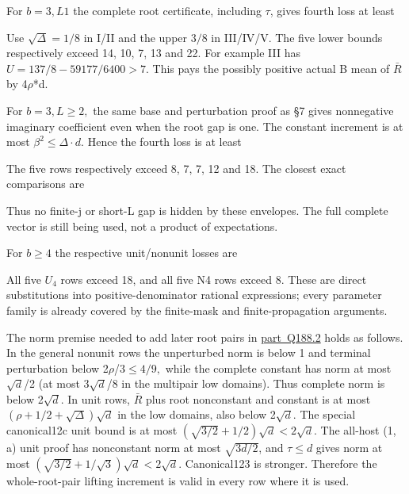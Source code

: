 For \(b=3,\allowbreak \allowbreak  L1\) the complete root certificate, including \(\tau\), gives fourth loss at least



Use \(\sqrt{\Delta}=1/8\) in I/II and the upper \(3/8\) in III/IV/V. The five lower bounds respectively exceed 14, 10, 7, 13 and 22. For example III has \(U=137/8-59177/6400>7\). This pays the possibly positive actual B mean of \(\bar R\) by 4\(\rho\)*d.

For \(b=3,\allowbreak \allowbreak  L\ge 2,\allowbreak \allowbreak  \) the same base and perturbation proof as §7 gives nonnegative imaginary coefficient even when the root gap is one. The constant increment is at most \(\beta^2\le \Delta\cdot d.\) Hence the fourth loss is at least



The five rows respectively exceed 8, 7, 7, 12 and 18. The closest exact comparisons are



Thus no finite-j or short-L gap is hidden by these envelopes. The full complete vector is still being used, not a product of expectations.

For \(b\ge 4\) the respective unit/nonunit losses are



All five \(U_{4}\) rows exceed 18, and all five N4 rows exceed 8. These are direct substitutions into positive-denominator rational expressions; every parameter family is already covered by the finite-mask and finite-propagation arguments.

The norm premise needed to add later root pairs in \mbox{\hyperref[part:Q188.2]{part Q188.2}} holds as follows. In the general nonunit rows the unperturbed norm is below 1 and terminal perturbation below 2\(\rho\)/\(3\le 4/9,\allowbreak \) while the complete constant has norm at most \(\sqrt{d}\)/2 (at most 3\(\sqrt{d}\)/8 in the multipair low domains). Thus complete norm is below 2\(\sqrt{d}\). In unit rows, \(\bar R\) plus root nonconstant and constant is at most \((\rho+1/2+\sqrt{\Delta})\sqrt{d}\) in the low domains, also below 2\(\sqrt{d}\). The special canonical12c unit bound is at most \((\sqrt{3/2}+1/2)\sqrt{d}<2\sqrt{d}\). The all-host (1, a) unit proof has nonconstant norm at most \(\sqrt{3d/2}\), and \(\tau\le d\) gives norm at most \((\sqrt{3/2}+1/\sqrt{3})\sqrt{d}<2\sqrt{d}\). Canonical123 is stronger. Therefore the whole-root-pair lifting increment is valid in every row where it is used.

